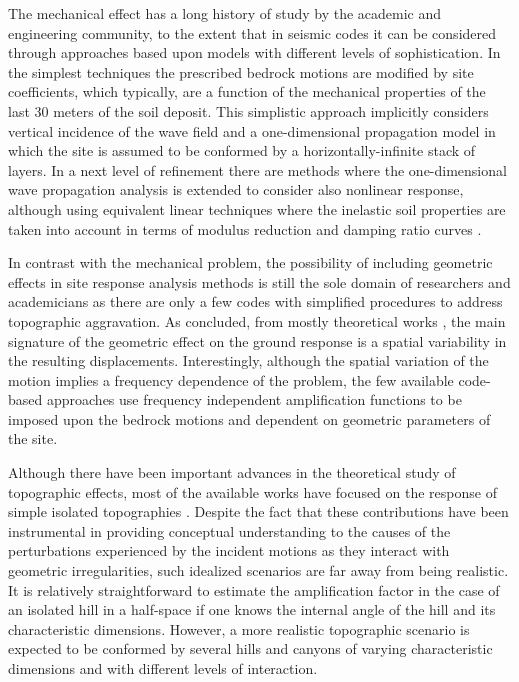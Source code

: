 \documentclass[11pt,letterpaper]{article}
\begin{document}
The mechanical effect has a long history of study by the academic and engineering community, to the extent that in seismic codes it can be considered through approaches based upon models with different levels of sophistication. In the simplest techniques the prescribed bedrock motions are modified by site coefficients, which typically, are a function of the mechanical properties of the last $30$ meters of the soil deposit. This simplistic approach implicitly considers vertical incidence of the wave field and a one-dimensional propagation model in which the site is assumed to be conformed by a horizontally-infinite stack of layers. In a next level of refinement there are methods where the one-dimensional wave propagation analysis is extended to consider also nonlinear response, although using equivalent linear techniques where the inelastic soil properties are taken into account in terms of modulus reduction and damping ratio curves \citep{shnabel1972shake, lysmer1975flush}.

In contrast with the mechanical problem, the possibility of including geometric effects in site response analysis methods is still the sole domain of researchers and academicians as there are only a few codes \citep{bard1995guidelines, code2005eurocode} with simplified procedures to address topographic aggravation. As concluded, from mostly theoretical works \citep{ashford1997topographic, geli1988effect, Trifunac1973, [1971]TRIFUNAC, sanchez-sesma91, sanchez1979ground, tsaur2008analytical}, the main signature of the geometric effect on the ground response is a spatial variability in the resulting displacements. Interestingly, although the spatial variation of the motion implies a frequency dependence of the problem, the few available code-based approaches use frequency independent amplification functions to be imposed upon the bedrock motions and dependent on geometric parameters of the site.

Although there have been important advances in the theoretical study of topographic effects, most of the available works have focused on the response of simple isolated topographies \citep{[1990]Sz, [1985]Sz, boore1972note, [1991a]TodyLee}. Despite the fact that these contributions have been instrumental in providing conceptual understanding to the causes of the perturbations experienced by the incident motions as they interact with geometric irregularities, such idealized scenarios are far away from being realistic. It is relatively straightforward to estimate the amplification factor in the case of an isolated hill in a half-space if one knows the internal angle of the hill and its characteristic dimensions. However, a more realistic topographic scenario is expected to be conformed by several hills and canyons of varying characteristic dimensions and with different levels of interaction.
\end{document}
